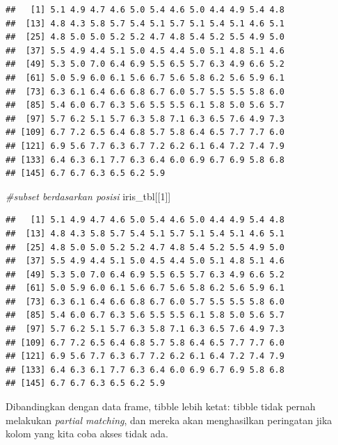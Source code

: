 \documentclass[]{book}
\newenvironment{Shaded}{\begin{snugshade}}{\end{snugshade}}
\newcommand{\DecValTok}[1]{\textcolor[rgb]{0.00,0.00,0.81}{#1}}
\newcommand{\CommentTok}[1]{\textcolor[rgb]{0.56,0.35,0.01}{\textit{#1}}}
\newcommand{\OperatorTok}[1]{\textcolor[rgb]{0.81,0.36,0.00}{\textbf{#1}}}
\newcommand{\NormalTok}[1]{#1}
\begin{document}
\begin{Shaded}
\end{Shaded}

\begin{verbatim}
##   [1] 5.1 4.9 4.7 4.6 5.0 5.4 4.6 5.0 4.4 4.9 5.4 4.8
##  [13] 4.8 4.3 5.8 5.7 5.4 5.1 5.7 5.1 5.4 5.1 4.6 5.1
##  [25] 4.8 5.0 5.0 5.2 5.2 4.7 4.8 5.4 5.2 5.5 4.9 5.0
##  [37] 5.5 4.9 4.4 5.1 5.0 4.5 4.4 5.0 5.1 4.8 5.1 4.6
##  [49] 5.3 5.0 7.0 6.4 6.9 5.5 6.5 5.7 6.3 4.9 6.6 5.2
##  [61] 5.0 5.9 6.0 6.1 5.6 6.7 5.6 5.8 6.2 5.6 5.9 6.1
##  [73] 6.3 6.1 6.4 6.6 6.8 6.7 6.0 5.7 5.5 5.5 5.8 6.0
##  [85] 5.4 6.0 6.7 6.3 5.6 5.5 5.5 6.1 5.8 5.0 5.6 5.7
##  [97] 5.7 6.2 5.1 5.7 6.3 5.8 7.1 6.3 6.5 7.6 4.9 7.3
## [109] 6.7 7.2 6.5 6.4 6.8 5.7 5.8 6.4 6.5 7.7 7.7 6.0
## [121] 6.9 5.6 7.7 6.3 6.7 7.2 6.2 6.1 6.4 7.2 7.4 7.9
## [133] 6.4 6.3 6.1 7.7 6.3 6.4 6.0 6.9 6.7 6.9 5.8 6.8
## [145] 6.7 6.7 6.3 6.5 6.2 5.9
\end{verbatim}

\begin{Shaded}
\begin{Highlighting}[]
\CommentTok{#subset berdasarkan posisi}
\NormalTok{iris_tbl[[}\DecValTok{1}\NormalTok{]]}
\end{Highlighting}
\end{Shaded}

\begin{verbatim}
##   [1] 5.1 4.9 4.7 4.6 5.0 5.4 4.6 5.0 4.4 4.9 5.4 4.8
##  [13] 4.8 4.3 5.8 5.7 5.4 5.1 5.7 5.1 5.4 5.1 4.6 5.1
##  [25] 4.8 5.0 5.0 5.2 5.2 4.7 4.8 5.4 5.2 5.5 4.9 5.0
##  [37] 5.5 4.9 4.4 5.1 5.0 4.5 4.4 5.0 5.1 4.8 5.1 4.6
##  [49] 5.3 5.0 7.0 6.4 6.9 5.5 6.5 5.7 6.3 4.9 6.6 5.2
##  [61] 5.0 5.9 6.0 6.1 5.6 6.7 5.6 5.8 6.2 5.6 5.9 6.1
##  [73] 6.3 6.1 6.4 6.6 6.8 6.7 6.0 5.7 5.5 5.5 5.8 6.0
##  [85] 5.4 6.0 6.7 6.3 5.6 5.5 5.5 6.1 5.8 5.0 5.6 5.7
##  [97] 5.7 6.2 5.1 5.7 6.3 5.8 7.1 6.3 6.5 7.6 4.9 7.3
## [109] 6.7 7.2 6.5 6.4 6.8 5.7 5.8 6.4 6.5 7.7 7.7 6.0
## [121] 6.9 5.6 7.7 6.3 6.7 7.2 6.2 6.1 6.4 7.2 7.4 7.9
## [133] 6.4 6.3 6.1 7.7 6.3 6.4 6.0 6.9 6.7 6.9 5.8 6.8
## [145] 6.7 6.7 6.3 6.5 6.2 5.9
\end{verbatim}

Dibandingkan dengan data frame, tibble lebih ketat: tibble tidak pernah
melakukan \emph{partial matching}, dan mereka akan menghasilkan
peringatan jika kolom yang kita coba akses tidak ada.
\end{document}
